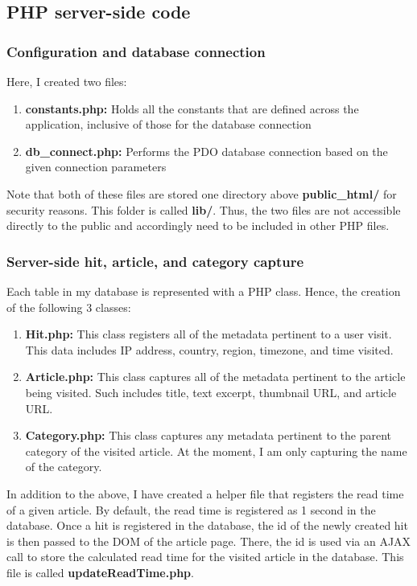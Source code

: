 \documentclass[12pt]{article}
\begin{document}
\subsection{PHP server-side code}
\subsubsection{Configuration and database connection}
Here, I created two files:
\begin{enumerate}
\item{\textbf{constants.php:}} Holds all the constants that are defined across the application, inclusive of those for the database connection
\item{\textbf{db\_connect.php:}} Performs the PDO database connection based on the given connection parameters
\end{enumerate}
Note that both of these files are stored one directory above \textbf{public\_html/} for security reasons. This folder is called \textbf{lib/}. Thus, the two files are not accessible directly to the public and accordingly need to be included in other PHP files.

\subsubsection{Server-side hit, article, and category capture}
Each table in my database is represented with a PHP class. Hence, the creation of the following 3 classes:
\begin{enumerate}
\item{\textbf{Hit.php:}} This class registers all of the metadata pertinent to a user visit. This data includes IP address, country, region, timezone, and time visited. 
\vfill
\item{\textbf{Article.php:}} This class captures all of the metadata pertinent to the article being visited. Such includes title, text excerpt, thumbnail URL, and article URL.
\vfill
\item{\textbf{Category.php:}} This class captures any metadata pertinent to the parent category of the visited article. At the moment, I am only capturing the name of the category.
\end{enumerate}
\vfill

In addition to the above, I have created a helper file that registers the read time of a given article. By default, the read time is registered as 1 second in the database. Once a hit is registered in the database, the id of the newly created hit is then passed to the DOM of the article page. There, the id is used via an AJAX call to store the calculated read time for the visited article in the database. This file is called \textbf{updateReadTime.php}.
\vfill
\end{document}
